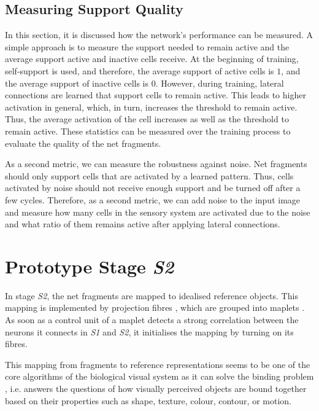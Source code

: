 \subsection{Measuring Support Quality}
In this section, it is discussed how the network's performance can be measured.
A simple approach is to measure the support needed to remain active and the average support active and inactive cells receive.
At the beginning of training, self-support is used, and therefore, the average support of active cells is $1$, and the average support of inactive cells is $0$.
However, during training, lateral connections are learned that support cells to remain active.
This leads to higher activation in general, which, in turn, increases the threshold to remain active.
Thus, the average activation of the cell increases as well as the threshold to remain active.
These statistics can be measured over the training process to evaluate the quality of the net fragments.

As a second metric, we can measure the robustness against noise.
Net fragments should only support cells that are activated by a learned pattern. Thus, cells activated by noise should not receive enough support and be turned off after a few cycles.
Therefore, as a second metric, we can add noise to the input image and measure how many cells in the sensory system are activated due to the noise and what ratio of them remains active after applying lateral connections.


\section{Prototype Stage \emph{S2}}
In stage \emph{S2}, the net fragments are mapped to idealised reference objects.
This mapping is implemented by projection fibres , which are grouped into maplets .
As soon as a control unit of a maplet detects a strong correlation between the neurons it connects in \emph{S1} and \emph{S2}, it initialises the mapping by turning on its fibres.

This mapping from fragments to reference representations seems to be one of the core algorithms of the biological visual system as it can solve the binding problem , i.e. answers the questions of how visually perceived objects are bound together based on their properties such as shape, texture, colour, contour, or motion.

